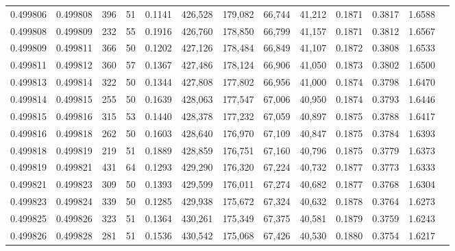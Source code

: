 \begin{tabular}{rrrrrrrrrrrrr}
0.499806 & 0.499808 & 396 &  51 &                                     0.1141 & 426,528 & 179,082 &  66,744 &  41,212 & 0.1871 & 0.3817 & 1.6588 \\
0.499808 & 0.499809 & 232 &  55 &                                     0.1916 & 426,760 & 178,850 &  66,799 &  41,157 & 0.1871 & 0.3812 & 1.6567 \\
0.499809 & 0.499811 & 366 &  50 &                                     0.1202 & 427,126 & 178,484 &  66,849 &  41,107 & 0.1872 & 0.3808 & 1.6533 \\
0.499811 & 0.499812 & 360 &  57 &                                     0.1367 & 427,486 & 178,124 &  66,906 &  41,050 & 0.1873 & 0.3802 & 1.6500 \\
0.499813 & 0.499814 & 322 &  50 &                                     0.1344 & 427,808 & 177,802 &  66,956 &  41,000 & 0.1874 & 0.3798 & 1.6470 \\
0.499814 & 0.499815 & 255 &  50 &                                     0.1639 & 428,063 & 177,547 &  67,006 &  40,950 & 0.1874 & 0.3793 & 1.6446 \\
0.499815 & 0.499816 & 315 &  53 &                                     0.1440 & 428,378 & 177,232 &  67,059 &  40,897 & 0.1875 & 0.3788 & 1.6417 \\
0.499816 & 0.499818 & 262 &  50 &                                     0.1603 & 428,640 & 176,970 &  67,109 &  40,847 & 0.1875 & 0.3784 & 1.6393 \\
0.499818 & 0.499819 & 219 &  51 &                                     0.1889 & 428,859 & 176,751 &  67,160 &  40,796 & 0.1875 & 0.3779 & 1.6373 \\
0.499819 & 0.499821 & 431 &  64 &                                     0.1293 & 429,290 & 176,320 &  67,224 &  40,732 & 0.1877 & 0.3773 & 1.6333 \\
0.499821 & 0.499823 & 309 &  50 &                                     0.1393 & 429,599 & 176,011 &  67,274 &  40,682 & 0.1877 & 0.3768 & 1.6304 \\
0.499823 & 0.499824 & 339 &  50 &                                     0.1285 & 429,938 & 175,672 &  67,324 &  40,632 & 0.1878 & 0.3764 & 1.6273 \\
0.499825 & 0.499826 & 323 &  51 &                                     0.1364 & 430,261 & 175,349 &  67,375 &  40,581 & 0.1879 & 0.3759 & 1.6243 \\
0.499826 & 0.499828 & 281 &  51 &                                     0.1536 & 430,542 & 175,068 &  67,426 &  40,530 & 0.1880 & 0.3754 & 1.6217 \\

\end{tabular}
